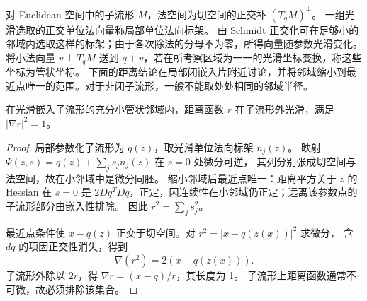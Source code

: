\begin{definition}[法空间与管状坐标]
对 Euclidean 空间中的子流形 $M$，法空间为切空间的正交补 $(T_qM)^\perp$。
一组光滑选取的正交单位法向量称局部单位法向标架。
由 Schmidt 正交化可在足够小的邻域内选取这样的标架；由于各次除法的分母不为零，所得向量随参数光滑变化。
将小法向量 $v\perp T_qM$ 送到 $q+v$，若在所考察区域为一一的光滑坐标变换，称这些坐标为管状坐标。
下面的距离结论在局部闭嵌入片附近讨论，并将邻域缩小到最近点唯一的范围。对于非闭子流形，一般不能取处处相同的邻域半径。
\end{definition}

\begin{proposition}
在光滑嵌入子流形的充分小管状邻域内，距离函数 $r$ 在子流形外光滑，满足
$|\nabla r|^2=1$。
\end{proposition}
\begin{proof}
局部参数化子流形为 $q(z)$，取光滑单位法向标架 $n_j(z)$。
映射 $\Psi(z,s)=q(z)+\sum_j s_jn_j(z)$ 在 $s=0$ 处微分可逆，
其列分别张成切空间与法空间，故在小邻域中是微分同胚。
缩小邻域后最近点唯一：距离平方关于 $z$ 的 Hessian 在 $s=0$ 是
$2Dq^TDq$，正定，因连续性在小邻域仍正定；远离该参数点的子流形部分由嵌入性排除。
因此 $r^2=\sum_j s_j^2$。

最近点条件使 $x-q(z)$ 正交于切空间。对 $r^2=|x-q(z(x))|^2$ 求微分，
含 $dq$ 的项因正交性消失，得到
\[
 \nabla(r^2)=2(x-q(z(x))).
\]
子流形外除以 $2r$，得 $\nabla r=(x-q)/r$，其长度为 1。
子流形上距离函数通常不可微，故必须排除该集合。
\end{proof}
